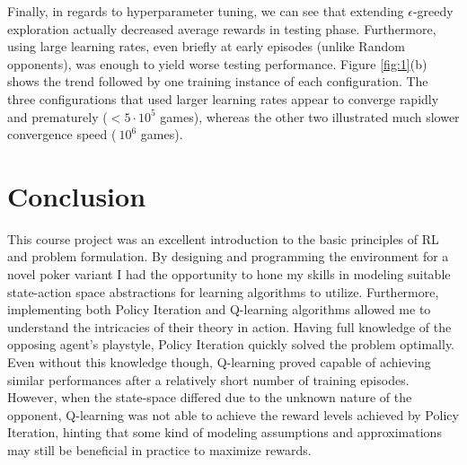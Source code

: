 Finally, in regards to hyperparameter tuning, we can see that extending $\epsilon$-greedy exploration actually decreased average rewards in testing phase. Furthermore, using large learning rates, even briefly at early episodes (unlike Random opponents), was enough to yield worse testing performance. Figure \ref{fig:1}(b) shows the trend followed by one training instance of each configuration. The three configurations that used larger learning rates appear to converge rapidly and prematurely ($<5\cdot10^5$ games), whereas the other two illustrated much slower convergence speed ($~10^6$ games).

\section{Conclusion}

This course project was an excellent introduction to the basic principles of RL and problem formulation. By designing and programming the environment for a novel poker variant I had the opportunity to hone my skills in modeling suitable state-action space abstractions for learning algorithms to utilize. Furthermore, implementing both Policy Iteration and Q-learning algorithms allowed me to understand the intricacies of their theory in action. Having full knowledge of the opposing agent's playstyle, Policy Iteration quickly solved the problem optimally. Even without this knowledge though, Q-learning proved capable of achieving similar performances after a relatively short number of training episodes. However, when the state-space differed due to the unknown nature of the opponent, Q-learning was not able to achieve the reward levels achieved by Policy Iteration, hinting that some kind of modeling assumptions and approximations may still be beneficial in practice to maximize rewards.

\clearpage

